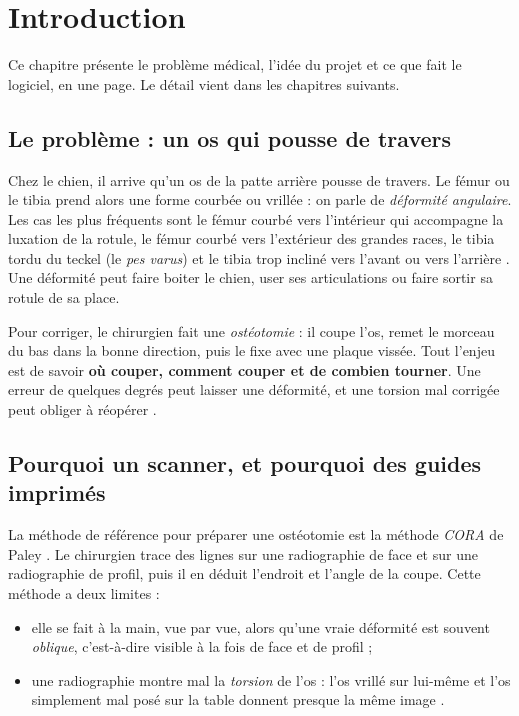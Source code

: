 \chapter{Introduction}
\label{chap:intro}

\begin{chapeau}
Ce chapitre présente le problème médical, l'idée du projet et ce que fait le logiciel, en une page. Le détail vient
dans les chapitres suivants.
\end{chapeau}

\section{Le problème : un os qui pousse de travers}

Chez le chien, il arrive qu'un os de la patte arrière pousse de travers. Le fémur ou le tibia prend alors une forme
courbée ou vrillée : on parle de \emph{déformité angulaire}. Les cas les plus fréquents sont le fémur courbé vers
l'intérieur qui accompagne la luxation de la rotule, le fémur courbé vers l'extérieur des grandes races, le tibia
tordu du teckel (le \emph{pes varus}) et le tibia trop incliné vers l'avant ou vers l'arrière
\cite{brower2017,vezzoni2022,petazzoni2012}. Une déformité peut faire boiter le chien, user ses articulations ou faire
sortir sa rotule de sa place.

Pour corriger, le chirurgien fait une \emph{ostéotomie} : il coupe l'os, remet le morceau du bas dans la bonne
direction, puis le fixe avec une plaque vissée. Tout l'enjeu est de savoir \textbf{où couper, comment couper et de
combien tourner}. Une erreur de quelques degrés peut laisser une déformité, et une torsion mal corrigée peut obliger à
réopérer \cite{worth2019}.

\section{Pourquoi un scanner, et pourquoi des guides imprimés}

La méthode de référence pour préparer une ostéotomie est la méthode \emph{CORA} de Paley \cite{paley2002}. Le
chirurgien trace des lignes sur une radiographie de face et sur une radiographie de profil, puis il en déduit
l'endroit et l'angle de la coupe. Cette méthode a deux limites :
\begin{itemize}
  \item elle se fait à la main, vue par vue, alors qu'une vraie déformité est souvent \emph{oblique}, c'est-à-dire
  visible à la fois de face et de profil \cite{kim2017} ;
  \item une radiographie montre mal la \emph{torsion} de l'os : l'os vrillé sur lui-même et l'os simplement mal posé
  sur la table donnent presque la même image \cite{apelt2005,aper2005}.
\end{itemize}

